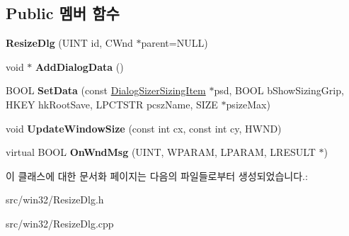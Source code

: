 \subsection*{Public 멤버 함수}
\begin{DoxyCompactItemize}
\item 
\mbox{\label{class_resize_dlg_a87bab778e9312f274ebe750d4c3a67ee}} 
{\bfseries Resize\+Dlg} (U\+I\+NT id, C\+Wnd $\ast$parent=N\+U\+LL)
\item 
\mbox{\label{class_resize_dlg_a5657ce3f83f261aceaf138cd1c69f0fc}} 
void $\ast$ {\bfseries Add\+Dialog\+Data} ()
\item 
\mbox{\label{class_resize_dlg_a6a3965f44a0c2f5ba9aaa798a9a81df5}} 
B\+O\+OL {\bfseries Set\+Data} (const \mbox{\hyperlink{struct_dialog_sizer_sizing_item}{Dialog\+Sizer\+Sizing\+Item}} $\ast$psd, B\+O\+OL b\+Show\+Sizing\+Grip, H\+K\+EY hk\+Root\+Save, L\+P\+C\+T\+S\+TR pcsz\+Name, S\+I\+ZE $\ast$psize\+Max)
\item 
\mbox{\label{class_resize_dlg_ae2d0d2b44dd32f668c6d9091b14bfc00}} 
void {\bfseries Update\+Window\+Size} (const int cx, const int cy, H\+W\+ND)
\item 
\mbox{\label{class_resize_dlg_a9d3f421da2488db11224b0508be654fd}} 
virtual B\+O\+OL {\bfseries On\+Wnd\+Msg} (U\+I\+NT, W\+P\+A\+R\+AM, L\+P\+A\+R\+AM, L\+R\+E\+S\+U\+LT $\ast$)
\end{DoxyCompactItemize}


이 클래스에 대한 문서화 페이지는 다음의 파일들로부터 생성되었습니다.\+:\begin{DoxyCompactItemize}
\item 
src/win32/Resize\+Dlg.\+h\item 
src/win32/Resize\+Dlg.\+cpp\end{DoxyCompactItemize}
